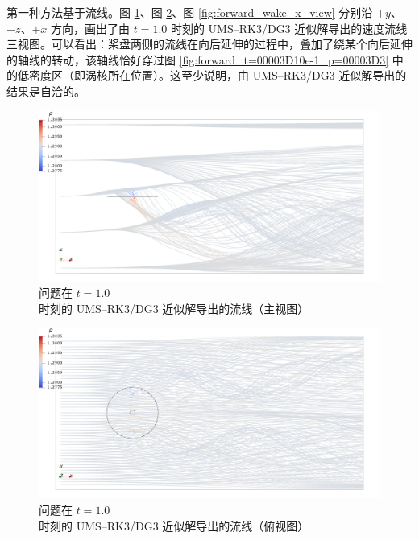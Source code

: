 第一种方法基于流线。图 \ref{fig:forward_wake_y_view}、图 \ref{fig:forward_wake_z_view}、图
\ref{fig:forward_wake_x_view} 分别沿 $+y$、$-z$、$+x$ 方向，画出了由 $t=1.0$
时刻的 UMS–RK3/DG3 近似解导出的速度流线三视图。可以看出：桨盘两侧的流线在向后延伸的过程中，叠加了绕某个向后延伸的轴线的转动，该轴线恰好穿过图
\ref{fig:forward_t=00003D10e-1_p=00003D3} 中的低密度区（即涡核所在位置）。这至少说明，由
UMS–RK3/DG3 近似解导出的结果是自洽的。

\begin{figure}[h!]
\begin{centering}
\includegraphics[width=1\textwidth,height=0.26\textheight,keepaspectratio]{figures/forward/p=3/y+}
\par\end{centering}
\caption{\label{fig:forward_wake_y_view}问题在
$t=1.0$ 时刻的 UMS–RK3/DG3 近似解导出的流线（主视图）}
\end{figure}

\begin{figure}[h!]
\begin{centering}
\includegraphics[width=1\textwidth,height=0.26\textheight,keepaspectratio]{figures/forward/p=3/z-}
\par\end{centering}
\caption{\label{fig:forward_wake_z_view}问题在
$t=1.0$ 时刻的 UMS–RK3/DG3 近似解导出的流线（俯视图）}
\end{figure}

